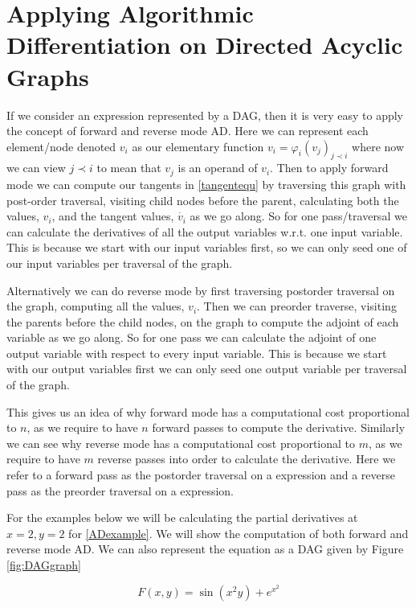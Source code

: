 \documentclass{article}
\begin{document}
\section{Applying Algorithmic Differentiation on Directed Acyclic Graphs}

If we consider an expression represented by a DAG, then it is very easy to apply the concept of forward and reverse mode AD. Here we can represent each element/node denoted $v_i$ as our elementary function $v_i = \varphi_i (v_j)_{j \prec i}$ where now we can view $j \prec i$ to mean that $v_j$ is an operand of $v_i$. Then to apply forward mode we can compute our tangents in \eqref{tangentequ} by traversing this graph with post-order traversal, visiting child nodes before the parent, calculating both the values, $v_i$, and the tangent values, $\Dot{v_i}$ as we go along. So for one pass/traversal we can calculate the derivatives of all the output variables w.r.t. one input variable. This is because we start with our input variables first, so we can only seed one of our input variables per traversal of the graph.

Alternatively we can do reverse mode by first traversing postorder traversal on the graph, computing all the values, $v_i$. Then we can preorder traverse, visiting the parents before the child nodes, on the graph to compute the adjoint of each variable as we go along. So for one pass we can calculate the adjoint of one output variable with respect to every input variable. This is because we start with our output variables first we can only seed one output variable per traversal of the graph.

This gives us an idea of why forward mode has a computational cost proportional to $n$, as we require to have $n$ forward passes to compute the derivative. Similarly we can see why reverse mode has a computational cost proportional to $m$, as we require to have $m$ reverse passes into order to calculate the derivative. Here we refer to a forward pass as the postorder traversal on a expression and a reverse pass as the preorder traversal on a expression.

For the examples below we will be calculating the partial derivatives at $x=2, y=2$ for \eqref{ADexample}. We will show the computation of both forward and reverse mode AD. We can also represent the equation as a DAG given by Figure \ref{fig:DAGgraph}

\begin{equation}
    \label{ADexample}
    F(x,y) = \sin(x^2y) + e^{x^2}
\end{equation}
\end{document}
